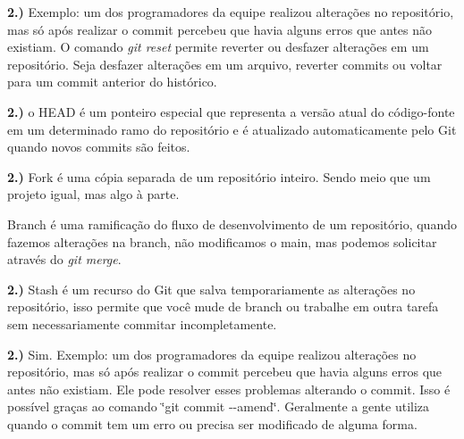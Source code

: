 {\bfseries{2.)}} Exemplo\+: um dos programadores da equipe realizou alterações no repositório, mas só após realizar o commit percebeu que havia alguns erros que antes não existiam. O comando {\itshape git reset} permite reverter ou desfazer alterações em um repositório. Seja desfazer alterações em um arquivo, reverter commits ou voltar para um commit anterior do histórico.

{\bfseries{2.)}} o H\+E\+AD é um ponteiro especial que representa a versão atual do código-\/fonte em um determinado ramo do repositório e é atualizado automaticamente pelo Git quando novos commits são feitos.

{\bfseries{2.)}} Fork é uma cópia separada de um repositório inteiro. Sendo meio que um projeto igual, mas algo à parte.

Branch é uma ramificação do fluxo de desenvolvimento de um repositório, quando fazemos alterações na branch, não modificamos o main, mas podemos solicitar através do {\itshape git merge}.

{\bfseries{2.)}} Stash é um recurso do Git que salva temporariamente as alterações no repositório, isso permite que você mude de branch ou trabalhe em outra tarefa sem necessariamente commitar incompletamente.

{\bfseries{2.)}} Sim. Exemplo\+: um dos programadores da equipe realizou alterações no repositório, mas só após realizar o commit percebeu que havia alguns erros que antes não existiam. Ele pode resolver esses problemas alterando o commit. Isso é possível graças ao comando \char`\"{}git commit -\/-\/amend\char`\"{}. Geralmente a gente utiliza quando o commit tem um erro ou precisa ser modificado de alguma forma. 